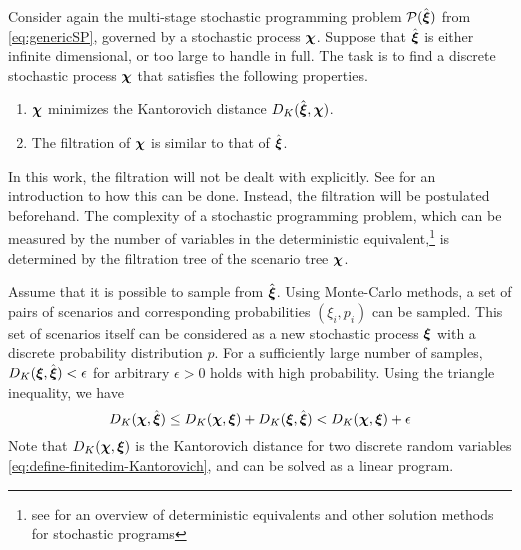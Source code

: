 Consider again the multi-stage stochastic programming problem $\mathcal{P}(\hat{\boldsymbol\xi})$ from \eqref{eq:genericSP}, governed by a stochastic process $\boldsymbol\chi$.
Suppose that $\hat{\boldsymbol\xi}$ is either infinite dimensional, or too large to handle in full.
The task is to find a discrete stochastic process $\boldsymbol\chi$ that satisfies the following properties.
\begin{enumerate}
\item $\boldsymbol\chi$ minimizes the Kantorovich distance $D_K(\hat{\boldsymbol\xi},\boldsymbol\chi)$.
\item The filtration of $\boldsymbol\chi$ is similar to that of $\hat{\boldsymbol\xi}$.
\end{enumerate}
In this work, the filtration will not be dealt with explicitly.
See \citet{Heitsch2010} for an introduction to how this can be done.
Instead, the filtration will be postulated beforehand.
The complexity of a stochastic programming problem, which can be measured by the number of variables in the deterministic equivalent,\footnote{see \citet{Birge1997} for an overview of deterministic equivalents and other solution methods for stochastic programs} is determined by the filtration tree of the scenario tree $\boldsymbol\chi$.

Assume that it is possible to sample from $\hat{\boldsymbol\xi}$.
Using Monte-Carlo methods, a set of pairs of scenarios and corresponding probabilities $(\xi_i,p_i)$ can be sampled.
This set of scenarios itself can be considered as a new stochastic process $\boldsymbol\xi$ with a discrete probability distribution $p$.
For a sufficiently large number of samples,  $D_K(\boldsymbol\xi,\hat{\boldsymbol\xi})<\epsilon$ for arbitrary $\epsilon>0$ holds with high probability.
Using the triangle inequality, we have
\begin{equation}
  \label{eq:triangle-montecarlo-kantoro}
  D_K(\boldsymbol\chi,\hat{\boldsymbol\xi}) \leq  D_K(\boldsymbol\chi, \boldsymbol\xi) + D_K(\boldsymbol\xi,\hat{\boldsymbol\xi})< D_K(\boldsymbol\chi,\boldsymbol\xi)+ \epsilon
\end{equation}
Note that $D_K(\boldsymbol\chi,\boldsymbol\xi)$ is the Kantorovich distance for two discrete random variables \eqref{eq:define-finitedim-Kantorovich}, and can be solved as a linear program.

